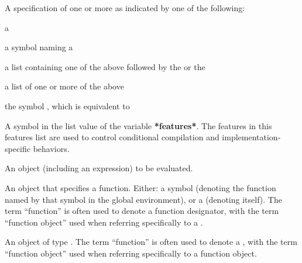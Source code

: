 \begin{glossary-list}
%
%
%
%
A specification of one or more  as indicated by
one of the following:
\begin{tightitemize}
\item a 
\item a symbol naming a 
\item
{}%
%
a list containing one of the above followed by the 
 or the  
\item a list of one or more of the above
\item the symbol , which is equivalent to
\end{tightitemize}


\glent[feature]
%
%
%
A symbol in the list value of the variable \textbf{*features*}.  The features
in this features list are used to control conditional compilation and
implementation-specific behaviors.


\glent[form]
%
%
%
%
%
An object (including an expression) to be evaluated.


%
%
%
%
%
An object that specifies a function.  Either: a symbol (denoting the function
named by that symbol in the global environment), or a 
(denoting itself).  The term ``function'' is often used to denote a
function designator, with the term ``function object'' used when referring
specifically to a .


%
%
An object of type .  The term ``function'' is often
used to denote a , with the term ``function
object'' used when referring specifically to a function object.


\end{glossary-list}
